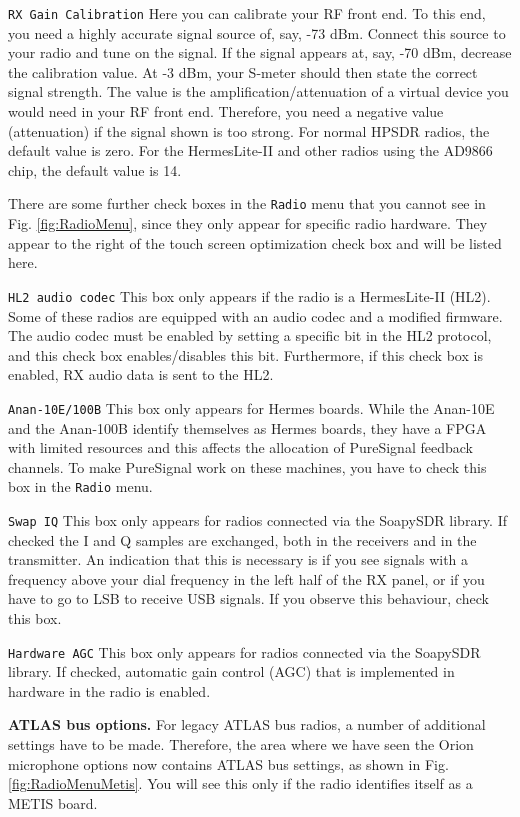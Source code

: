 \documentclass[12pt]{book}
\def\rett#1{\texttt{\color{red}#1}}
\def\bltt#1{\texttt{\color{blue}#1}}
\begin{document}
\rett{RX Gain Calibration} Here you can calibrate your RF front end. To this end, you
need a highly accurate signal source of, say, -73 dBm. Connect this source to your
radio and tune on the signal. If the signal appears at, say, -70 dBm, decrease the
calibration value. At -3 dBm, your S-meter should then state the correct signal
strength. The value is the  amplification/attenuation of  a virtual device you
would need in your RF front end. Therefore, you need a negative value (attenuation)
if the signal shown is too strong. For normal HPSDR radios, the default value is
 zero. For the HermesLite-II and other radios using the AD9866 chip, the default
 value is 14.
 
 There are some further check boxes in the \bltt{Radio} menu that you cannot see
 in Fig. \ref{fig:RadioMenu}, since they only appear for specific radio hardware.
 They appear to the right of the touch screen optimization check box
 and will be listed here.
 
 \rett{HL2 audio codec} This box only appears if the radio is a HermesLite-II (HL2). Some
 of these radios are equipped with an audio codec and a modified firmware. The
 audio codec must be enabled by setting a specific bit in the HL2 protocol,
 and this check box enables/disables this bit. Furthermore, if this check box
 is enabled, RX audio data is sent to the HL2.
 
 \rett{Anan-10E/100B} This box only appears for Hermes boards. While the Anan-10E and
 the Anan-100B identify themselves as Hermes boards, they have a FPGA with limited
 resources and this affects the allocation of PureSignal feedback channels. To make
 PureSignal work on these machines, you have to check this box in the \bltt{Radio} menu.
 
 \rett{Swap IQ} This box only appears for radios connected via the SoapySDR library. If checked
 the I and Q samples are exchanged, both in the receivers and in the transmitter. An indication
 that this is necessary is if you see signals with a frequency above your dial frequency in
 the left half of the RX panel, or if you have to go to LSB to receive USB signals. If you
 observe this behaviour, check this box.
 
 \rett{Hardware AGC} This box only appears for radios connected via the SoapySDR library.
 If checked, automatic gain control (AGC) that is implemented in hardware in the radio is enabled.
 
 \textbf{ATLAS bus options.} For legacy ATLAS bus radios, a number of additional settings have to be
 made. Therefore, the area where we have seen the Orion microphone options now contains ATLAS bus
 settings, as shown in Fig. \ref{fig:RadioMenuMetis}. You will see this only if the radio identifies
 itself as a METIS board.
  
\end{document}
